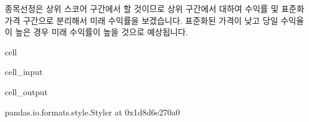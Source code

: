 \documentclass[letterpaper,10pt,english]{jupyterBook}
\begin{document}
\sphinxAtStartPar
 종목선정은 상위 스코어 구간에서 할 것이므로 상위 구간에서 대하여 수익률 및 표준화 가격 구간으로 분리해서 미래 수익률을 보겠습니다. 표준화된 가격이 낮고 당일 수익율이 높은 경우 미래 수익률이 높을 것으로 예상됩니다.

\begin{sphinxuseclass}{cell}\begin{sphinxVerbatimInput}

\begin{sphinxuseclass}{cell_input}
\begin{sphinxVerbatim}[commandchars=\\\{\}]
  \PYG{p}{[}\PYG{p}{[}\PYG{p}{]}  \PYG{p}{]}

\PYG{p}{[}\PYG{p}{]}   \PYG{p}{[}\PYG{p}{]}  
\PYG{p}{[}\PYG{p}{]}   \PYG{p}{[}\PYG{p}{]}  
\PYG{p}{[}\PYG{p}{]}\PYG{p}{[}\PYG{p}{]}
\end{sphinxVerbatim}

\end{sphinxuseclass}\end{sphinxVerbatimInput}
\begin{sphinxVerbatimOutput}

\begin{sphinxuseclass}{cell_output}
\begin{sphinxVerbatim}[commandchars=\\\{\}]
\PYGZlt{}pandas.io.formats.style.Styler at 0x1d8d6e270a0\PYGZgt{}
\end{sphinxVerbatim}

\end{sphinxuseclass}\end{sphinxVerbatimOutput}

\end{sphinxuseclass}
\end{document}

